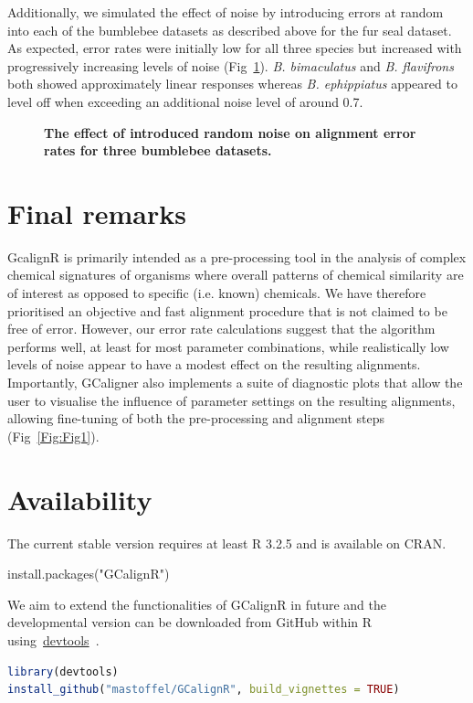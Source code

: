 \documentclass[10pt,letterpaper]{article}
\begin{document}
Additionally, we simulated the effect of noise by introducing errors at random into each of the bumblebee datasets as described above for the fur seal dataset. As expected, error rates were initially low for all three species but increased with progressively increasing levels of noise (Fig~\ref{Fig:Fig8}).  \textit{B. bimaculatus} and \textit{B. flavifrons} both showed approximately linear responses whereas \textit{B. ephippiatus} appeared to level off when exceeding an additional noise level of around 0.7.

\begin{figure}[htbp]
\centering
\caption{\textbf{The effect of introduced random noise on alignment error rates for three bumblebee datasets.}}
\label{Fig:Fig8}
\end{figure} 

\section*{Final remarks}
GcalignR is primarily intended as a pre-processing tool in the analysis of complex chemical signatures of organisms where overall patterns of chemical similarity are of interest as opposed to specific (i.e. known) chemicals. We have therefore prioritised an objective and fast alignment procedure that is not claimed to be free of error.  However, our error rate calculations suggest that the algorithm performs well, at least for most parameter combinations, while realistically low levels of noise appear to have a modest effect on the resulting alignments. Importantly, GCaligner also implements a suite of diagnostic plots that allow the user to visualise the influence of parameter settings on the resulting alignments, allowing fine-tuning of both the pre-processing and alignment steps (Fig~\ref{Fig:Fig1}).

\section*{Availability}
The current stable version requires at least R 3.2.5 and is available on CRAN.

install.packages("GCalignR")

We aim to extend the functionalities of GCalignR in future and the developmental version can be downloaded from GitHub within R using~\href{https://cran.r-project.org/web/packages/devtools/index.html}{devtools}~\cite{Wickham.2016}. 

\begin{lstlisting}[language=R]
library(devtools)
install_github("mastoffel/GCalignR", build_vignettes = TRUE)
\end{lstlisting}
\end{document}
